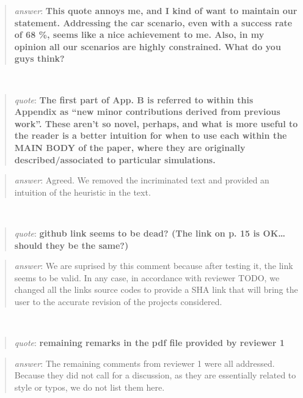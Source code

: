 \documentclass[a4paper]{article}
\newcommand\quot[1]{\begin{quote} \textit{quote}: \textbf{#1}\end{quote}}
\newcommand\as[1]{\begin{quote} \textit{answer}: {#1}\end{quote} \leavevmode \\ }
\begin{document}
\as{\textbf{This quote annoys me, and I kind of want to maintain our statement. Addressing the car scenario, even with a success rate of 68 \%, seems like a nice achievement to me.
Also, in my opinion all our scenarios are highly constrained. What do you guys think?}}

\quot{
The first part of App. B is referred to within this Appendix as “new minor contributions derived from previous work”. These aren’t so novel, perhaps, and what is more useful to the reader is a better intuition for when to use each within the MAIN BODY of the paper, where they are originally described/associated to particular simulations.
}

\as{Agreed. We removed the incriminated text and provided an intuition of the heuristic in the text.}

\quot{github link seems to be dead? (The link on p. 15 is OK… should they be the same?)}

\as{We are suprised by this comment because after testing it, the link seems to be valid. In any case, in accordance with reviewer TODO, we changed all the links source codes to provide a SHA link that will bring the user to the accurate revision of the projects considered.}

\quot{remaining remarks in the pdf file provided by reviewer 1}
\as{The remaining comments from reviewer 1 were all addressed. Because they did not call for a discussion, as they are essentially related to style or typos, we do not list them here.}
\end{document}
